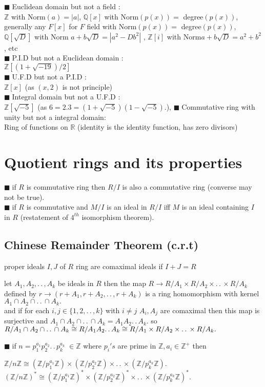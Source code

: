 \documentclass[11pt]{extarticle}
\newcommand{\ra}{\rightarrow}
\newcommand{\R}{\mathbb{R}}
\newcommand{\Z}{\mathbb{Z}}
\newcommand{\Q}{\mathbb{Q}}
\newcommand{\ck}{.\,.\,}
\newcommand{\tm}{\times}
\newcommand{\snote}[1]{{\footnotesize(#1)}}
\newcommand{\tbx}[2][]{
	\begin{tcolorbox}[enhanced,breakable,size=small,colback=black!2!white,title={#1},arc is angular, arc=1.5mm,drop fuzzy shadow]
		#2
	\end{tcolorbox}
}
\newcommand{\y}{$\blacksquare\;$}
\begin{document}
\begin{multicols}{2}
\tbx[Some examples]{
	\y Euclidean domain but not a field :\\
	$ \Z $ with Norm$ (a)=|a| $, $ \Q[x] $ with Norm$ (p(x)) =$ degree$ (p(x)) $, generally any $ F[x] $ for $ F $ field  with Norm$ (p(x)) =$ degree$ (p(x)) $, $ \Q[\sqrt{D}] $ with Norm $ a+b\sqrt{D} =|a^2-Db^2|$ , $ \Z[i] $  with Norm$ a+b\sqrt{D} =a^2+b^2$, etc\\
	\y P.I.D but not a Euclidean domain :\\
	$ \Z[(1+\sqrt{-19})/2] $  \\
	\y U.F.D but not a P.I.D : \\
	$ \Z[x] $ \snote{as $ (x,2) $ is not principle}\\
	\y Integral domain but not a U.F.D :\\
	$ \Z[\sqrt{-5}] $ \snote{as $ 6=2.3=(1+\sqrt{-5})(1-\sqrt{-5}) $.},
	\y Commutative ring with unity but not a integral domain:\\
	Ring of functions on $ \R $ \snote{identity is the identity function, has zero divisors}
}

\section{Quotient rings and its properties}
\tbx{ \y if $ R $ is commutative ring then $ R/I $ is also a commutative ring (converse may not be true).\\
\y if $ R $ is commutative and $ M/I $ is an ideal in $ R/I $ iff $ M $ is an ideal containing $ I $ in $ R $ \snote{restatement of $ 4^{th} $ isomorphism theorem}.	 }

	\subsection{Chinese Remainder Theorem (c.r.t)}

\tbx{proper ideals $ I,J $ of $ R $ ring are comaximal ideals if $ I+J=R $
} 
\tbx[c.r.t]{ let $ A_1,A_2,\ck , A_k $ be ideals in $ R $ then the map 
	$ R \ra R/A_1 \tm R/A_2 \tm \ck \tm R/A_k $ defined by $ r \ra (r+A_1,r+A_2,\ck , r+A_k) $ is a 
	ring homomorphism with kernel $ A_1\cap A_2 \cap \ck \cap A_k. $\\
	and if for each $ i,j \in \{1,2,\ck , k\} $ with $ i\neq j $ $ A_i,A_j $ are comaximal then this 
	map is surjective and  $ A_1\cap A_2 \cap \ck \cap A_k=A_1A_2\ck A_k. $ so 
  $ R/ A_1\cap A_2 \cap \ck \cap A_k\cong\\
   R/A_1A_2\ck A_k\cong R/A_1 \tm R/A_2 \tm \ck \tm R/A_k.$  } 
\tbx[Consequences of c.r.t]{
	\y if $ n=p_1^{a_1}p_2^{a_2}\ck p_k^{a_k} \; \in \Z $ where $ p_i's$ are prime in $ \Z, a_i\in  
	\Z^+ $ then 
	\begin{center}
		$ \Z/n\Z \cong (\Z/p_1^{a_1}\Z)\tm (\Z/p_2^{a_2}\Z)\tm \ck \tm (\Z/p_k^{a_k}\Z). $
		$ (\Z/n\Z)^* \cong (\Z/p_1^{a_1}\Z)^*\tm (\Z/p_2^{a_2}\Z)^*\tm \ck \tm (\Z/p_k^{a_k}\Z)^*. $
	\end{center}
	
}
\end{multicols}
\end{document}
